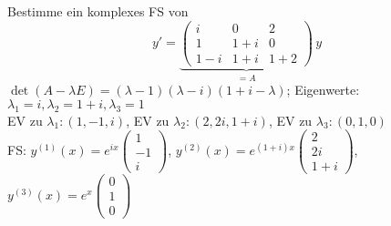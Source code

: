 \documentclass[a4paper,twoside,DIV15,BCOR12mm]{scrbook}
\begin{document}
\begin{beispiele} %
\item Bestimme ein komplexes FS von
$$y' = \underbrace{\begin{pmatrix}i & 0 & 2 \\ 1 & 1+i & 0 \\ 1-i & 1+i & 1+2\end{pmatrix}}_{=A}\,y$$
$\det(A-\lambda E) = (\lambda - 1)(\lambda - i)(1+i-\lambda)$; Eigenwerte: $\lambda_1 = i, \lambda_2 = 1+i, \lambda_3 = 1$ \\
EV zu $\lambda_1: (1,-1,i)$, EV zu $\lambda_2: (2, 2i, 1+i)$, EV zu $\lambda_3: (0, 1, 0)$ \\
FS: $y^{(1)}(x) = e ^{ix} \begin{pmatrix}1\\-1\\i\end{pmatrix}$, $y^{(2)}(x) = e ^{(1+i)x} \begin{pmatrix}2\\2i\\1+i\end{pmatrix}$, $y^{(3)}(x) = e ^{x} \begin{pmatrix}0\\1\\0\end{pmatrix}$


\end{beispiele}
\end{document}
